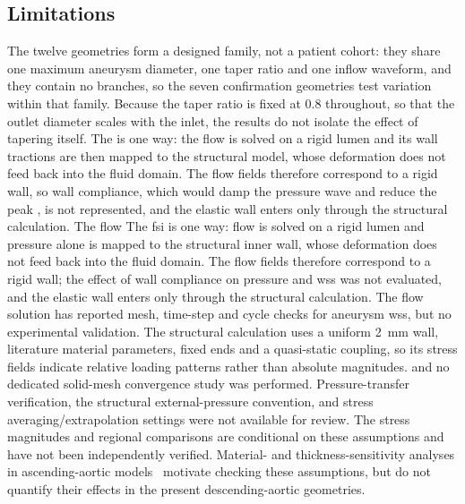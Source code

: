 \documentclass[12pt,a4paper]{article}
\newcommand{\cfdrevision}[1]{#1} %
\newcommand{\FSI}{\ac{fsi}\xspace}
\newcommand{\WSS}{\ac{wss}\xspace}
\theoremstyle{definition}
\numberwithin{equation}{section}
\providecommand{\DIFaddtex}[1]{{\protect\color{blue} \sf #1}} %
\providecommand{\DIFdeltex}[1]{{\protect\color{red} \scriptsize #1}} %
\providecommand{\DIFaddbegin}{} %
\providecommand{\DIFaddend}{} %
\providecommand{\DIFdelbegin}{} %
\providecommand{\DIFdelend}{} %
\providecommand{\DIFadd}[1]{\texorpdfstring{\DIFaddtex{#1}}{#1}} %
\providecommand{\DIFdel}[1]{\texorpdfstring{\DIFdeltex{#1}}{}} %
\newcommand{\DIFscaledelfig}{0.5}
\newlength{\DIFdelgraphicswidth} %
\newlength{\DIFdelgraphicsheight} %
\newcommand{\DIFaddincludegraphics}[2][]{{\color{blue}\fbox{\DIFOincludegraphics[#1]{#2}}}} %
\newcommand{\DIFdelincludegraphics}[2][]{%
\sbox{\DIFdelgraphicsbox}{\DIFOincludegraphics[#1]{#2}}%
\settoboxwidth{\DIFdelgraphicswidth}{\DIFdelgraphicsbox} %
\settoboxtotalheight{\DIFdelgraphicsheight}{\DIFdelgraphicsbox} %
\scalebox{\DIFscaledelfig}{%
\parbox[b]{\DIFdelgraphicswidth}{\usebox{\DIFdelgraphicsbox}\\[-\baselineskip] \rule{\DIFdelgraphicswidth}{0em}}\llap{\resizebox{\DIFdelgraphicswidth}{\DIFdelgraphicsheight}{%
\setlength{\unitlength}{\DIFdelgraphicswidth}%
\begin{picture}(1,1)%
\thicklines\linethickness{2pt} %
{\color[rgb]{1,0,0}\put(0,0){\framebox(1,1){}}}%
{\color[rgb]{1,0,0}\put(0,0){\line( 1,1){1}}}%
{\color[rgb]{1,0,0}\put(0,1){\line(1,-1){1}}}%
\end{picture}%
}\hspace*{3pt}}} %
} %
\DeclareRobustCommand{\DIFaddbegin}{\DIFOaddbegin \let\includegraphics\DIFaddincludegraphics} %
\DeclareRobustCommand{\DIFaddend}{\DIFOaddend \let\includegraphics\DIFOincludegraphics} %
\DeclareRobustCommand{\DIFdelbegin}{\DIFOdelbegin \let\includegraphics\DIFdelincludegraphics} %
\DeclareRobustCommand{\DIFdelend}{\DIFOaddend \let\includegraphics\DIFOincludegraphics} %
\begin{document}
\subsection{Limitations}
\label{Limitations}
The twelve geometries form a designed family, not a patient cohort: they share one maximum aneurysm diameter, one taper ratio and one inflow waveform, and they contain no branches, so the seven confirmation geometries test variation within that family. Because the taper ratio is fixed at 0.8 throughout, so that the outlet diameter scales with the inlet, the results do not isolate the effect of tapering itself. \DIFdelbegin \DIFdel{The }%
\DIFdel{is one way: the flow is solved on a rigid lumen and its wall tractions are then mapped to the structural model, whose deformation does not feed back into the fluid domain. The flow fields therefore correspond to a rigid wall, so wall compliance, which would damp the pressure wave and reduce the peak }%
\DIFdel{, is not represented, and the elastic wall enters only through the structural calculation. The flow }\DIFdelend \DIFaddbegin \DIFadd{\cfdrevision{The \FSI is one way: flow is solved on a rigid lumen and pressure alone is mapped to the structural inner wall, whose deformation does not feed back into the fluid domain.} \cfdrevision{The flow fields therefore correspond to a rigid wall; the effect of wall compliance on pressure and \WSS was not evaluated, and the elastic wall enters only through the structural calculation.} The flow }\DIFaddend solution has reported mesh, time-step and cycle checks for aneurysm \WSS, but no experimental validation. The structural calculation uses a uniform 2~mm wall, literature material parameters, fixed ends and a quasi-static coupling, \DIFdelbegin \DIFdel{so its stress fields indicate relative loading patterns rather than absolute magnitudes.
}\DIFdelend \DIFaddbegin \DIFadd{\cfdrevision{and no dedicated solid-mesh convergence study was performed. Pressure-transfer verification, the structural external-pressure convention, and stress averaging/extrapolation settings were not available for review. The stress magnitudes and regional comparisons are conditional on these assumptions and have not been independently verified. Material- and thickness-sensitivity analyses in ascending-aortic models~\cite{zhu2025material} motivate checking these assumptions, but do not quantify their effects in the present descending-aortic geometries.}
}\DIFaddend 
\end{document}
